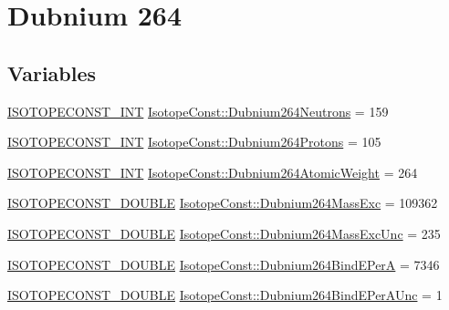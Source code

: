\hypertarget{group___isotope_const-_dubnium-_db264}{}\section{Dubnium 264}
\label{group___isotope_const-_dubnium-_db264}
\subsection*{Variables}
\begin{DoxyCompactItemize}
\item 
\mbox{\hyperlink{group___isotope_const-_macros_ga5f18360b3e99483a35c32d789e62621c}{I\+S\+O\+T\+O\+P\+E\+C\+O\+N\+S\+T\+\_\+\+I\+NT}} \mbox{\hyperlink{group___isotope_const-_dubnium-_db264_gad3eb0f74179f0c3f7d423537d6257e83}{Isotope\+Const\+::\+Dubnium264\+Neutrons}} = 159
\item 
\mbox{\hyperlink{group___isotope_const-_macros_ga5f18360b3e99483a35c32d789e62621c}{I\+S\+O\+T\+O\+P\+E\+C\+O\+N\+S\+T\+\_\+\+I\+NT}} \mbox{\hyperlink{group___isotope_const-_dubnium-_db264_ga74faf58f67fb1413dffa417128abd25d}{Isotope\+Const\+::\+Dubnium264\+Protons}} = 105
\item 
\mbox{\hyperlink{group___isotope_const-_macros_ga5f18360b3e99483a35c32d789e62621c}{I\+S\+O\+T\+O\+P\+E\+C\+O\+N\+S\+T\+\_\+\+I\+NT}} \mbox{\hyperlink{group___isotope_const-_dubnium-_db264_ga8a2595ea4c8afe3af679382a2b5d41d4}{Isotope\+Const\+::\+Dubnium264\+Atomic\+Weight}} = 264
\item 
\mbox{\hyperlink{group___isotope_const-_macros_ga8f45a7272ce02c0b4c65c44636ed719a}{I\+S\+O\+T\+O\+P\+E\+C\+O\+N\+S\+T\+\_\+\+D\+O\+U\+B\+LE}} \mbox{\hyperlink{group___isotope_const-_dubnium-_db264_gac39e7156dec2d7c326c2305d486f552c}{Isotope\+Const\+::\+Dubnium264\+Mass\+Exc}} = 109362
\item 
\mbox{\hyperlink{group___isotope_const-_macros_ga8f45a7272ce02c0b4c65c44636ed719a}{I\+S\+O\+T\+O\+P\+E\+C\+O\+N\+S\+T\+\_\+\+D\+O\+U\+B\+LE}} \mbox{\hyperlink{group___isotope_const-_dubnium-_db264_ga94b65a192efa8ca15931fd675b00cb41}{Isotope\+Const\+::\+Dubnium264\+Mass\+Exc\+Unc}} = 235
\item 
\mbox{\hyperlink{group___isotope_const-_macros_ga8f45a7272ce02c0b4c65c44636ed719a}{I\+S\+O\+T\+O\+P\+E\+C\+O\+N\+S\+T\+\_\+\+D\+O\+U\+B\+LE}} \mbox{\hyperlink{group___isotope_const-_dubnium-_db264_ga112b8091aec9a2f5c62498e6ec57a977}{Isotope\+Const\+::\+Dubnium264\+Bind\+E\+PerA}} = 7346
\item 
\mbox{\hyperlink{group___isotope_const-_macros_ga8f45a7272ce02c0b4c65c44636ed719a}{I\+S\+O\+T\+O\+P\+E\+C\+O\+N\+S\+T\+\_\+\+D\+O\+U\+B\+LE}} \mbox{\hyperlink{group___isotope_const-_dubnium-_db264_gae83f08f68944523eb527e1e1f6bfc3c2}{Isotope\+Const\+::\+Dubnium264\+Bind\+E\+Per\+A\+Unc}} = 1

\end{DoxyCompactItemize}
